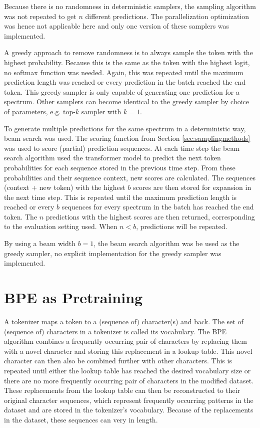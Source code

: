 Because there is no randomness in deterministic samplers, the sampling algorithm was not repeated to get $n$ different predictions.
The parallelization optimization was hence not applicable here and only one version of these samplers was implemented.

A greedy approach to remove randomness is to always sample the token with the highest probability.
Because this is the same as the token with the highest logit, no softmax function was needed.
Again, this was repeated until the maximum prediction length was reached or every prediction in the batch reached the end token.
This greedy sampler is only capable of generating one prediction for a spectrum.
Other samplers can become identical to the greedy sampler by choice of parameters, e.g. top-$k$ sampler with $k=1$.

To generate multiple predictions for the same spectrum in a deterministic way, beam search was used.
The scoring function from Section \ref{sec:samplingmethods} was used to score (partial) prediction sequences.
At each time step the beam search algorithm used the transformer model to predict the next token probabilities for each sequence stored in the previous time step.
From these probabilities and their sequence context, new scores are calculated.
The sequences (context + new token) with the highest $b$ scores are then stored for expansion in the next time step.
This is repeated until the maximum prediction length is reached or every $b$ sequences for every spectrum in the batch has reached the end token.
The $n$ predictions with the highest scores are then returned, corresponding to the evaluation setting used.
When $n < b$, predictions will be repeated.

By using a beam width $b=1$, the beam search algorithm was be used as the greedy sampler, no explicit implementation for the greedy sampler was implemented.

\section{BPE as Pretraining}
\label{sec:bpe}

A tokenizer maps a token to a (sequence of) character(s) and back. The set of (sequence of) characters in a tokenizer is called its vocabulary.
The \ac{BPE} algorithm combines a frequently occurring pair of characters by replacing them with a novel character and storing this replacement in a lookup table.
This novel character can then also be combined further with other characters. 
This is repeated until either the lookup table has reached the desired vocabulary size or there are no more frequently occurring pair of characters in the modified dataset.
These replacements from the lookup table can then be reconstructed to their original character sequences, which represent frequently occurring patterns in the dataset and are stored in the tokenizer's vocabulary.
Because of the replacements in the dataset, these sequences can very in length.

